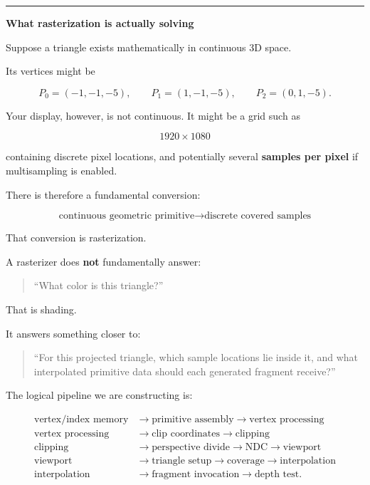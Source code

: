 \begin{center}\rule{0.5\linewidth}{0.5pt}\end{center}

\textbf{What rasterization is actually solving}

Suppose a triangle exists mathematically in continuous 3D space.

Its vertices might be

\[
P_0=(-1,-1,-5),\qquad
P_1=(1,-1,-5),\qquad
P_2=(0,1,-5).
\]

Your display, however, is not continuous. It might be a grid such as

\[
1920\times1080
\]

containing discrete pixel locations, and potentially several \textbf{samples per pixel} if multisampling is enabled.

There is therefore a fundamental conversion:

\[
\boxed{\text{continuous geometric primitive}
\longrightarrow
\text{discrete covered samples}}
\]

That conversion is rasterization.

A rasterizer does \textbf{not} fundamentally answer:

\begin{quote}
``What color is this triangle?''
\end{quote}

That is shading.

It answers something closer to:

\begin{quote}
``For this projected triangle, which sample locations lie inside it, and what interpolated primitive data should each generated fragment receive?''
\end{quote}

The logical pipeline we are constructing is:

\[\begin{aligned}\text{vertex/index memory} &\rightarrow \text{primitive assembly} \rightarrow \text{vertex processing}\\\text{vertex processing} &\rightarrow \text{clip coordinates} \rightarrow \text{clipping}\\\text{clipping} &\rightarrow \text{perspective divide} \rightarrow \text{NDC} \rightarrow \text{viewport}\\\text{viewport} &\rightarrow \text{triangle setup} \rightarrow \text{coverage} \rightarrow \text{interpolation}\\\text{interpolation} &\rightarrow \text{fragment invocation} \rightarrow \text{depth test}.\end{aligned}\]


